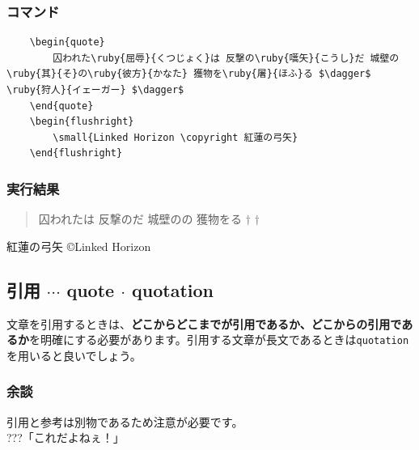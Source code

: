 \documentclass[a4j, titlepage]{jarticle}
\begin{document}
\begin{multicols}{2}

    \subsubsection*{コマンド}
    \begin{lstlisting}
    \begin{quote}
        囚われた\ruby{屈辱}{くつじょく}は 反撃の\ruby{嚆矢}{こうし}だ 城壁の\ruby{其}{そ}の\ruby{彼方}{かなた} 獲物を\ruby{屠}{ほふ}る $\dagger$ \ruby{狩人}{イェーガー} $\dagger$
    \end{quote}
    \begin{flushright}
        \small{Linked Horizon \copyright 紅蓮の弓矢}
    \end{flushright}
    \end{lstlisting}

    \vfill\null
    \columnbreak

    \subsubsection*{実行結果}
    \begin{screen}
        \begin{quote}
            囚われたは 反撃のだ 城壁のの 獲物をる $\dagger$  $\dagger$
        \end{quote}
        \begin{flushright}
            \small 紅蓮の弓矢  \copyright Linked Horizon  \normalsize
        \end{flushright}
    \end{screen}
    \end{multicols}

\subsection{引用 $\cdots$ quote $\cdot$ quotation}
文章を引用するときは、\textbf{どこからどこまでが引用であるか、どこからの引用であるか}を明確にする必要があります。引用する文章が長文であるときは\verb|quotation|を用いると良いでしょう。
\subsubsection*{余談}
引用と参考は別物であるため注意が必要です。\\ \quad \scriptsize ???「これだよねぇ！」\normalsize
\end{document}
